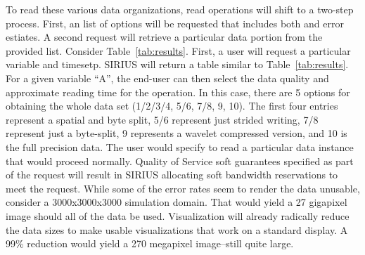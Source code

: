 To read these various data organizations, read operations will shift to a
two-step process. First, an list of options will be requested that includes
both and error estiates. A second request will retrieve a particular data
portion from the provided list. Consider Table~\ref{tab:results}.  First, a
user will request a particular variable and timesetp. SIRIUS will return a
table similar to Table~\ref{tab:results}. For a given variable ``A'',
the end-user can then select the data quality and approximate reading time for
the operation. In this case, there are 5 options for obtaining the whole data
set (1/2/3/4, 5/6, 7/8, 9, 10). The first four entries represent a spatial and
byte split, 5/6 represent just strided writing, 7/8 represent just a
byte-split, 9 represents a wavelet compressed version, and 10 is the full
precision data.  The user would specify to read a particular data instance that
would proceed normally.  Quality of Service soft guarantees specified as part
of the request will result in SIRIUS allocating soft bandwidth reservations to
meet the request. While some of the error rates seem to render the data
unusable, consider a 3000x3000x3000 simulation domain. That would yield a 27
gigapixel image should all of the data be used. Visualization will already
radically reduce the data sizes to make usable visualizations that work on a
standard display. A 99\% reduction would yield a 270 megapixel image--still
quite large.
